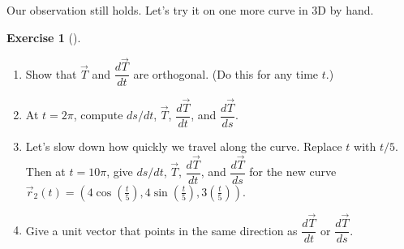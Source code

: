 \documentclass[10pt,]{book}
\theoremstyle{plain}
\theoremstyle{definition}
\theoremstyle{definition}
\theoremstyle{definition}
\theoremstyle{definition}
\newtheorem{exploration}[project]{Exercise}
\theoremstyle{definition}
\numberwithin{equation}{section}
\begin{document}
Our observation still holds. Let's try it on one more curve in 3D by hand.%
\begin{exploration}[]\label{exploration-174}
\leavevmode%
\begin{enumerate}[font=\bfseries,label=(\alph*),ref=\alph*]
\item\label{task-428} Show that \(\vec T\) and \(\dfrac{d\vec T}{dt}\) are orthogonal. (Do this for any time \(t\).)%
\item\label{task-429} At \(t=2\pi\), compute \(ds/dt\), \(\vec T\), \(\dfrac{d\vec T}{dt}\), and \(\dfrac{d\vec T}{ds}\).%
\item\label{task-430} Let's slow down how quickly we travel along the curve.  Replace \(t\) with \(t/5\).  Then at \(t=10\pi\), give \(ds/dt\), \(\vec T\), \(\dfrac{d\vec T}{dt}\), and \(\dfrac{d\vec T}{ds}\) for the new curve \(\vec r_2(t) =(4\cos(\frac{t}{5}),4\sin(\frac{t}{5}), 3(\frac{t}{5}))\).%
\item\label{task-431} Give a unit vector that points in the same direction as \(\dfrac{d\vec T}{dt}\) or \(\dfrac{d\vec T}{ds}\).%
\end{enumerate}
\end{exploration}
\typeout{************************************************}
\typeout{************************************************}
\end{document}
